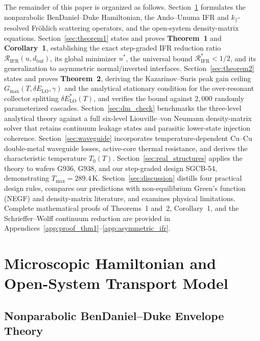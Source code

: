 \documentclass[11pt,letterpaper]{article}
\begin{document}
The remainder of this paper is organized as follows. Section~\ref{sec:model} formulates the nonparabolic BenDaniel--Duke Hamiltonian, the Ando--Unuma IFR and $k_\parallel$-resolved Fr\"ohlich scattering operators, and the open-system density-matrix equations. Section~\ref{sec:theorem1} states and proves \textbf{Theorem~1} and \textbf{Corollary~1}, establishing the exact step-graded IFR reduction ratio $\mathcal{R}_{\mathrm{IFR}}(u, d_{\mathrm{buf}})$, its global minimizer $u^*$, the universal bound $\mathcal{R}_{\mathrm{IFR}}^* < 1/2$, and its generalization to asymmetric normal/inverted interfaces. Section~\ref{sec:theorem2} states and proves \textbf{Theorem~2}, deriving the Kazarinov--Suris peak gain ceiling $G_{\max}(T, \delta E_{\mathrm{LO}}, \gamma)$ and the analytical stationary condition for the over-resonant collector splitting $\delta E_{\mathrm{LO}}^*(T)$, and verifies the bound against $2{,}000$ randomly parameterized cascades. Section~\ref{sec:dm_check} benchmarks the three-level analytical theory against a full six-level Liouville--von Neumann density-matrix solver that retains continuum leakage states and parasitic lower-state injection coherence. Section~\ref{sec:waveguide} incorporates temperature-dependent $\mathrm{Cu}$--$\mathrm{Cu}$ double-metal waveguide losses, active-core thermal resistance, and derives the characteristic temperature $T_0(T)$. Section~\ref{sec:real_structures} applies the theory to wafers G936, G938, and our step-graded design SGCB-54, demonstrating $T_{\max} = 289.4\,\mathrm{K}$. Section~\ref{sec:discussion} distills four practical design rules, compares our predictions with non-equilibrium Green's function (NEGF) and density-matrix literature, and examines physical limitations. Complete mathematical proofs of Theorems~1 and~2, Corollary~1, and the Schrieffer--Wolff continuum reduction are provided in Appendices~\ref{app:proof_thm1}--\ref{app:asymmetric_ifr}.

\section{Microscopic Hamiltonian and Open-System Transport Model}
\label{sec:model}

\subsection{Nonparabolic BenDaniel--Duke Envelope Theory}
\label{subsec:bendaniel_duke}
\end{document}
